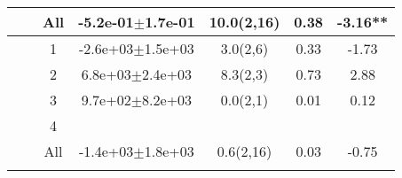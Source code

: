 \begin{longtable}{llccccS[table-format=-2.2, table-space-text-post = {***}]}
   &  & All & -5.2e-01$\pm$1.7e-01 & 10.0(2,16) & 0.38 & -3.16** \\ 
   \midrule
{} & {} & 1 & -2.6e+03$\pm$1.5e+03 & 3.0(2,6) & 0.33 & -1.73 \\ 
   &  & 2 &  6.8e+03$\pm$2.4e+03 & 8.3(2,3) & 0.73 & 2.88 \\ 
   &  & 3 &  9.7e+02$\pm$8.2e+03 & 0.0(2,1) & 0.01 & 0.12 \\ 
   &  & 4 &  &  &  &  \\ 
   &  & All & -1.4e+03$\pm$1.8e+03 & 0.6(2,16) & 0.03 & -0.75 \\ 
   \bottomrule
\label{bivar_lm_summ}
\end{longtable}


